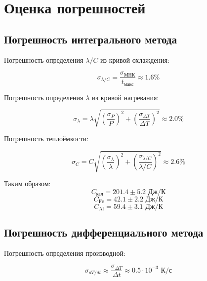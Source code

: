 \documentclass{article}
\begin{document}
\section*{Оценка погрешностей}

\subsection*{Погрешность интегрального метода}

Погрешность определения $\lambda/C$ из кривой охлаждения:

\begin{equation}
\sigma_{\lambda/C} = \frac{\sigma_{\text{МНК}}}{t_{\text{макс}}} \approx 1.6\%
\end{equation}

Погрешность определения $\lambda$ из кривой нагревания:

\begin{equation}
\sigma_{\lambda} = \lambda \sqrt{\left(\frac{\sigma_P}{P}\right)^2 + \left(\frac{\sigma_{\Delta T}}{\Delta T}\right)^2} \approx 2.0\%
\end{equation}

Погрешность теплоёмкости:

\begin{equation}
\sigma_C = C \sqrt{\left(\frac{\sigma_{\lambda}}{\lambda}\right)^2 + \left(\frac{\sigma_{\lambda/C}}{\lambda/C}\right)^2} \approx 2.6\%
\end{equation}

Таким образом:
\begin{equation}
C_{\text{кал}} = 201.4 \pm 5.2 \text{ Дж/К}
\end{equation}
\begin{equation}
C_{\text{Fe}} = 42.1 \pm 2.2 \text{ Дж/К}
\end{equation}
\begin{equation}
C_{\text{Al}} = 59.4 \pm 3.1 \text{ Дж/К}
\end{equation}

\subsection*{Погрешность дифференциального метода}

Погрешность определения производной:

\begin{equation}
\sigma_{dT/dt} \approx \frac{\sigma_{\Delta T}}{\Delta t} \approx 0.5 \cdot 10^{-3} \text{ К/с}
\end{equation}
\end{document}
